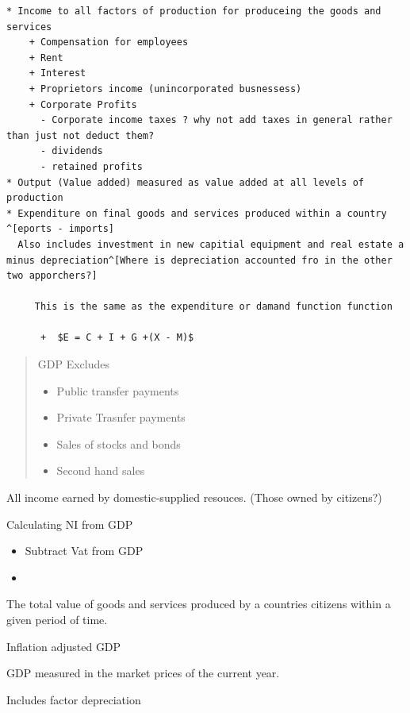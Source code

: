 \documentclass{tufte-book}
\providecommand{\tightlist}{%
  \setlength{\itemsep}{0pt}\setlength{\parskip}{0pt}}
\begin{document}
\begin{verbatim}
* Income to all factors of production for produceing the goods and services
    + Compensation for employees
    + Rent
    + Interest
    + Proprietors income (unincorporated busnessess)
    + Corporate Profits
      - Corporate income taxes ? why not add taxes in general rather than just not deduct them?
      - dividends
      - retained profits
* Output (Value added) measured as value added at all levels of production
* Expenditure on final goods and services produced within a country ^[eports - imports]
  Also includes investment in new capitial equipment and real estate a minus depreciation^[Where is depreciation accounted fro in the other two apporchers?]

     This is the same as the expenditure or damand function function

      +  $E = C + I + G +(X - M)$
\end{verbatim}

\begin{quote}
GDP Excludes

\begin{itemize}
\tightlist
\item
  Public transfer payments
\item
  Private Trasnfer payments
\item
  Sales of stocks and bonds
\item
  Second hand sales
\end{itemize}
\end{quote}

\begin{description}
\tightlist
\item[NI]
All income earned by domestic-supplied resouces. (Those owned by
citizens?)
\end{description}

Calculating NI from GDP

\begin{itemize}
\item
  Subtract Vat from GDP
\item
\end{itemize}

\begin{description}
\tightlist
\item[GNP]
The total value of goods and services produced by a countries citizens
within a given period of time.
\item[Real GDP]
Inflation adjusted GDP
\item[Nominal GDP]
GDP measured in the market prices of the current year.
\item[NDP]
Includes factor depreciation
\end{description}
\end{document}
